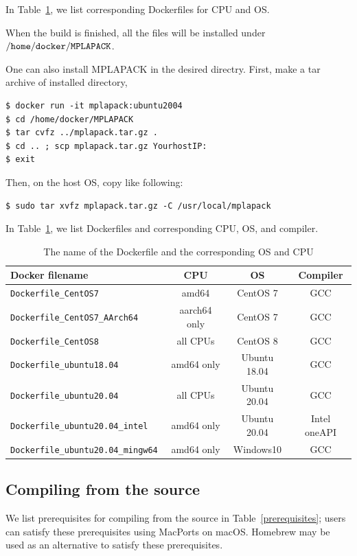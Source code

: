 \documentclass[12pt]{article}
\begin{document}
In Table~\ref{dockerfiles}, we list corresponding Dockerfiles for CPU and OS. 

When the build is finished, all the files will be installed under $\tt /home/docker/MPLAPACK$.

One can also install MPLAPACK in the desired directry. First, make a tar archive of installed directory,
\begin{verbatim}
$ docker run -it mplapack:ubuntu2004
$ cd /home/docker/MPLAPACK
$ tar cvfz ../mplapack.tar.gz .
$ cd .. ; scp mplapack.tar.gz YourhostIP:
$ exit
\end{verbatim}
Then, on the host OS, copy like following:
\begin{verbatim}
$ sudo tar xvfz mplapack.tar.gz -C /usr/local/mplapack
\end{verbatim}
In Table~\ref{dockerfiles}, we list Dockerfiles and corresponding CPU, OS, and compiler.

\begin{table}
\caption{The name of the Dockerfile and the corresponding OS and CPU}\label{dockerfiles}
\begin{center}
\begin{tabular}{l|c|c|c}
Docker filename                      & CPU          & OS            & Compiler \\ \hline
\tt Dockerfile\_CentOS7              & amd64        & CentOS 7       & GCC \\
\tt Dockerfile\_CentOS7\_AArch64     & aarch64 only & CentOS 7       & GCC\\
\tt Dockerfile\_CentOS8              & all CPUs     & CentOS 8  & GCC \\
\tt Dockerfile\_ubuntu18.04          & amd64 only   & Ubuntu 18.04 & GCC  \\
\tt Dockerfile\_ubuntu20.04          & all CPUs     & Ubuntu 20.04  & GCC\\
\tt Dockerfile\_ubuntu20.04\_intel   & amd64 only   & Ubuntu 20.04  & Intel oneAPI \\
\tt Dockerfile\_ubuntu20.04\_mingw64 & amd64 only   & Windows10     & GCC \\ \hline
\end{tabular}
\end{center}
\end{table}

\subsection{Compiling from the source}
We list prerequisites for compiling from the source in Table~\ref{prerequisites}; users can satisfy these prerequisites using MacPorts on macOS. Homebrew may be used as an alternative to satisfy these prerequisites.
\end{document}
